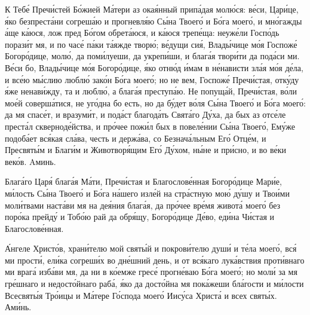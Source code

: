 \begin{mymulticols}
К Теб\'{е} Преч\'{и}стей Б\'{о}жией М\'{а}тери аз ока\'{я}нный прип\'{а}дая мол\'{ю}ся: в\'{е}си, Цар\'{и}це, \'{я}ко безпрест\'{а}ни согреш\'{а}ю и прогневл\'{я}ю С\'{ы}на Твоег\'{о} и Б\'{о}га моег\'{о}, и мн\'{о}гажды \'{а}ще к\'{а}юся, лож пред Б\'{о}гом обрет\'{а}юся, и к\'{а}юся треп\'{е}ща: неуж\'{е}ли Госп\'{о}дь пораз\'{и}т мя, и по час\'{е} п\'{а}ки т\'{а}яжде твор\'{ю}; в\'{е}дущи си\'{я}, Влад\'{ы}чице м\'{о}я Госпож\'{е} Богор\'{о}дице, мол\'{ю}, да пом\'{и}луеши, да укреп\'{и}ши, и благ\'{а}я твор\'{и}ти да под\'{а}си ми. В\'{е}си бо, Влад\'{ы}чице м\'{о}я Богор\'{о}дице, \'{я}ко отн\'{ю}д \'{и}мам в н\'{е}нависти зл\'{а}я м\'{о}я д\'{е}ла, и вс\'{е}ю м\'{ы}слию любл\'{ю} зак\'{о}н Б\'{о}га моег\'{о}; но не вем, Госпож\'{е} Преч\'{и}стая, отк\'{у}ду \'{я}же ненав\'{и}жду, та и любл\'{ю}, а благ\'{а}я преступ\'{а}ю. Не попущ\'{а}й, Преч\'{и}стая, в\'{о}ли мо\'{е}й соверш\'{а}тися, не уг\'{о}дна бо есть, но да б\'{у}дет в\'{о}ля С\'{ы}на Твоег\'{о} и Б\'{о}га моег\'{о}: да мя спас\'{е}т, и вразум\'{и}т, и под\'{а}ст благод\'{а}ть Свят\'{а}го Д\'{у}ха, да бых аз отс\'{е}ле прест\'{а}л сквернод\'{е}йства, и пр\'{о}чее пож\'{и}л бых в повел\'{е}нии С\'{ы}на Твоег\'{о}, Ем\'{у}же подоб\'{а}ет вс\'{я}кая сл\'{а}ва, честь и держ\'{а}ва, со Безнач\'{а}льным Ег\'{о} Отц\'{е}м, и Пресвят\'{ы}м и Благ\'{и}м и Животвор\'{я}щим Ег\'{о} Д\'{у}хом, н\'{ы}не и пр\'{и}сно, и во в\'{е}ки век\'{о}в. Aминь.


Благ\'{а}го Цар\'{я} благ\'{а}я М\'{а}ти, Преч\'{и}стая и Благослов\'{е}нная Богор\'{о}дице Мар\'{и}е, м\'{и}лость С\'{ы}на Твоег\'{о} и Б\'{о}га н\'{а}шего изл\'{е}й на стр\'{а}стную мо\'{ю} д\'{у}шу и Тво\'{и}ми мол\'{и}твами наст\'{а}ви мя на де\'{я}ния благ\'{а}я, да пр\'{о}чее вр\'{е}мя живот\'{а} моег\'{о} без пор\'{о}ка прейд\'{у} и Тоб\'{о}ю рай да обр\'{я}щу, Богор\'{о}дице Д\'{е}во, ед\'{и}на Ч\'{и}стая и Благослов\'{е}нная.


\'{А}нгеле Христ\'{о}в, хран\'{и}телю мой свят\'{ы}й и покров\'{и}телю душ\'{и} и т\'{е}ла моег\'{о}, вс\'{я} ми прост\'{и}, ел\'{и}ка согреш\'{и}х во дн\'{е}шний день, и от вс\'{я}каго лук\'{а}вствия прот\'{и}внаго ми враг\'{а} изб\'{а}ви мя, да ни в к\'{о}емже грес\'{е} прогн\'{е}ваю Б\'{о}га моег\'{о}; но мол\'{и} за мя гр\'{е}шнаго и недост\'{о}йнаго раб\'{а}, \'{я}ко да дост\'{о}йна мя пок\'{а}жеши бл\'{а}гости и м\'{и}лости Всесвят\'{ы}я Тр\'{о}ицы и М\'{а}тере Г\'{о}спода моег\'{о} Иис\'{у}са Христ\'{а} и всех свят\'{ы}х. Ам\'{и}нь.


\end{mymulticols}
